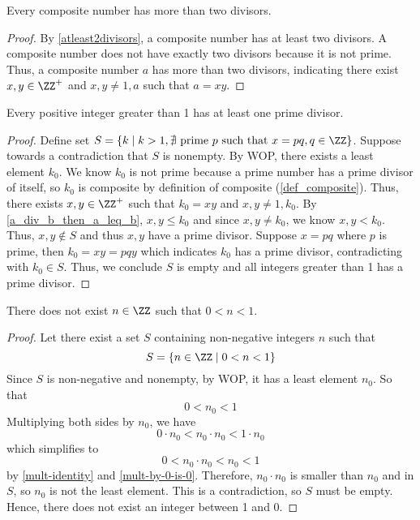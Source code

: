 \begin{lemma}
    Every composite number has more than two divisors.
\end{lemma}

\begin{proof}
    By \ref{atleast2divisors}, a composite number has at least two divisors. A composite number does not have exactly two divisors because it is not prime. Thus, a composite number $a$ has more than two divisors, indicating there exist $x,y\in\ZZ^+$ and $x,y\neq 1,a$ such that $a=xy$.
\end{proof}

\begin{lemma}\label{every_has_prime_divisor}
    Every positive integer greater than 1 has at least one prime divisor. 
\end{lemma}
\begin{proof}
    Define set $S=\left\{k\mid k>1, \nexists \text{ prime } p \text{ such that } x=pq, q\in\ZZ  \right\}$. Suppose towards a contradiction that $S$ is nonempty. By WOP, there exists a least element $k_0$. We know $k_0$ is not prime because a prime number has a prime divisor of itself, so $k_0$ is composite by definition of composite (\ref{def_composite}). Thus, there exists $x,y\in\ZZ^+$ such that $k_0=xy$ and $x,y\neq 1,k_0$. By \ref{a_div_b_then_a_leq_b}, $x,y\leq k_0$ and since $x,y\neq k_0$, we know $x,y<k_0$. Thus, $x,y\notin S$ and thus $x,y$ have a prime divisor. Suppose $x=pq$ where $p$ is prime, then $k_0=xy=pqy$ which indicates $k_0$ has a prime divisor, contradicting with $k_0\in S$. Thus, we conclude $S$ is empty and all integers greater than 1 has a prime divisor.
\end{proof}

\begin{theorem} \label{nibzo}
    There does not exist $n \in \ZZ$ such that $0 < n < 1$.
\end{theorem}
\begin{proof}
    Let there exist a set $S$ containing non-negative integers $n$ such that 
     \[S=\{ n \in \ZZ \mid 0 < n < 1\}\]
    Since $S$ is non-negative and nonempty, by WOP, it has a least element $n_0$. So that
    \[0<n_0<1\]
    Multiplying both sides by $n_0$, we have
    \[0 \cdot n_0<n_0 \cdot n_0<1 \cdot n_0\]
    which simplifies to
    \[0 <n_0 \cdot n_0<n_0 <1\]
    by \ref{mult-identity} and \ref{mult-by-0-is-0}. Therefore, $n_0 \cdot n_0$ is smaller than $n_0$ and in $S$, so $n_0$ is not the least element. This is a contradiction, so $S$ must be empty. Hence, there does not exist an integer between 1 and 0.
\end{proof}

